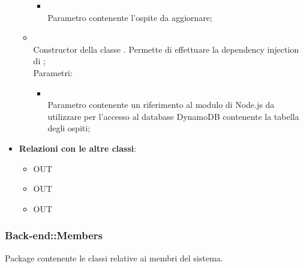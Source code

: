 \begin{itemize}
\begin{itemize}
\begin{itemize}
			\item {} \\
			Parametro contenente l'ospite da aggiornare;
		\end{itemize}
		\item[]  \\		Constructor della classe . Permette di effettuare la dependency injection di ;\\
		Parametri:
		\begin{itemize}
			\item {} \\
			Parametro contenente un riferimento al modulo di Node.js da utilizzare per l'accesso al database DynamoDB contenente la tabella degli ospiti;
		\end{itemize}
	\end{itemize}
	\item \textbf{Relazioni con le altre classi}:
	\begin{itemize}
		\item OUT \hyperlink{Guest_label}{}
		\item OUT \hyperlink{GuestObservable_label}{}
		\item OUT \hyperlink{ErrorObservable_label}{}
	\end{itemize}
\end{itemize}
\FloatBarrier

\subsubsection{Back-end::Members}
Package contenente le classi relative ai membri del sistema.
